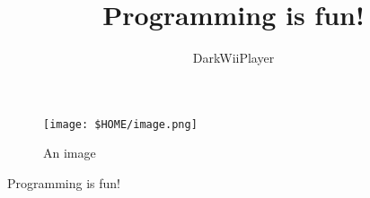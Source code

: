 \documentclass{article}
\title{Programming is fun!}
\author{DarkWiiPlayer}
\begin{document}
\maketitle

\begin{figure}[h]
	\centering
	\texttt{[image: \$HOME/image.png]}
	\caption{An image}
	\label{fig:image1}
\end{figure}

Programming is fun! \cite{sicp}

\printbibliography
\end{document}
